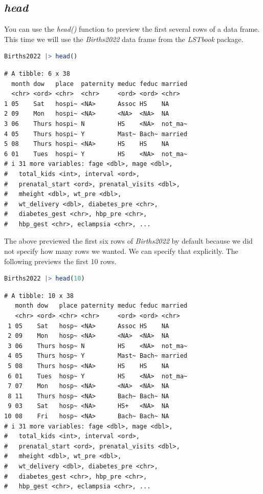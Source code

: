 \documentclass[
  12pt,
  letterpaper,
  DIV=11,
  numbers=noendperiod]{scrreprt}
\begin{document}
\subsection{\texorpdfstring{\emph{head}}{head}}\label{head}

You can use the \emph{head()} function to preview the first several rows
of a data frame. This time we will use the \emph{Births2022} data frame
from the \emph{LSTbook} package.

\begin{lstlisting}[language=R]
Births2022 |> head()
\end{lstlisting}

\begin{lstlisting}
# A tibble: 6 x 38
  month dow   place  paternity meduc feduc married
  <chr> <ord> <chr>  <chr>     <ord> <ord> <chr>  
1 05    Sat   hospi~ <NA>      Assoc HS    NA     
2 09    Mon   hospi~ <NA>      <NA>  <NA>  NA     
3 06    Thurs hospi~ N         HS    <NA>  not_ma~
4 05    Thurs hospi~ Y         Mast~ Bach~ married
5 08    Thurs hospi~ <NA>      HS    HS    NA     
6 01    Tues  hospi~ Y         HS    <NA>  not_ma~
# i 31 more variables: fage <dbl>, mage <dbl>,
#   total_kids <int>, interval <ord>,
#   prenatal_start <ord>, prenatal_visits <dbl>,
#   mheight <dbl>, wt_pre <dbl>,
#   wt_delivery <dbl>, diabetes_pre <chr>,
#   diabetes_gest <chr>, hbp_pre <chr>,
#   hbp_gest <chr>, eclampsia <chr>, ...
\end{lstlisting}

The above previewed the first six rows of \emph{Births2022} by default
because we did not specify how many rows we wanted. We can specify that
explicitly. The following previews the first 10 rows.

\begin{lstlisting}[language=R]
Births2022 |> head(10)
\end{lstlisting}

\begin{lstlisting}
# A tibble: 10 x 38
   month dow   place paternity meduc feduc married
   <chr> <ord> <chr> <chr>     <ord> <ord> <chr>  
 1 05    Sat   hosp~ <NA>      Assoc HS    NA     
 2 09    Mon   hosp~ <NA>      <NA>  <NA>  NA     
 3 06    Thurs hosp~ N         HS    <NA>  not_ma~
 4 05    Thurs hosp~ Y         Mast~ Bach~ married
 5 08    Thurs hosp~ <NA>      HS    HS    NA     
 6 01    Tues  hosp~ Y         HS    <NA>  not_ma~
 7 07    Mon   hosp~ <NA>      <NA>  <NA>  NA     
 8 11    Thurs hosp~ <NA>      Bach~ Bach~ NA     
 9 03    Sat   hosp~ <NA>      HS+   <NA>  NA     
10 08    Fri   hosp~ <NA>      Bach~ Bach~ NA     
# i 31 more variables: fage <dbl>, mage <dbl>,
#   total_kids <int>, interval <ord>,
#   prenatal_start <ord>, prenatal_visits <dbl>,
#   mheight <dbl>, wt_pre <dbl>,
#   wt_delivery <dbl>, diabetes_pre <chr>,
#   diabetes_gest <chr>, hbp_pre <chr>,
#   hbp_gest <chr>, eclampsia <chr>, ...
\end{lstlisting}
\end{document}
